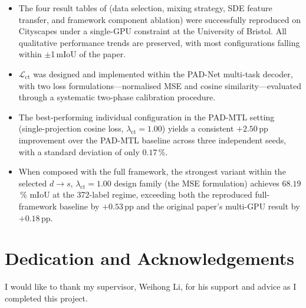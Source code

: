 \documentclass[
  oneside,
  author={Shijie Lu},
  degree={BSc},
  title={Label-Efficient Semantic Segmentation via Self-Supervised Depth Estimation and Cross-Task Consistency},
  unit={COMS30045},
  subtitle={}
]{dissertation}
\begin{document}
\begin{itemize}

  \item The four result tables of \cite{hoyer2023improving} (data
    selection, mixing strategy, SDE feature transfer, and framework
    component ablation) were successfully reproduced on Cityscapes under
    a single-GPU constraint at the University of Bristol. All qualitative
    performance trends are preserved, with most configurations falling
    within $\pm$1\,mIoU of the paper.
  
  \item $\mathcal{L}_\text{ct}$ was designed and implemented within the
    PAD-Net multi-task decoder, with two loss formulations---normalised
    MSE and cosine similarity---evaluated through a systematic two-phase
    calibration procedure.
  
  \item The best-performing individual configuration in the PAD-MTL setting
    (single-projection cosine loss, $\lambda_\text{ct}=1.00$) yields a
    consistent $+2.50$\,pp improvement over the PAD-MTL baseline across three
    independent seeds, with a standard deviation of only $0.17$\,\%.
  
  \item When composed with the full framework, the strongest variant within
    the selected $d{\rightarrow}s$, $\lambda_\text{ct}=1.00$ design family
    (the MSE formulation) achieves $68.19$\,\% mIoU at the 372-label regime,
    exceeding both the reproduced full-framework baseline by $+0.53$\,pp
    and the original paper's multi-GPU result by $+0.18$\,pp.
  
  \end{itemize}

\chapter*{Dedication and Acknowledgements}

\vspace{1cm}

\noindent
I would like to thank my supervisor, Weihong Li, for his support and
advice as I completed this project.

\makedecl

\makeaidecl
\end{document}

